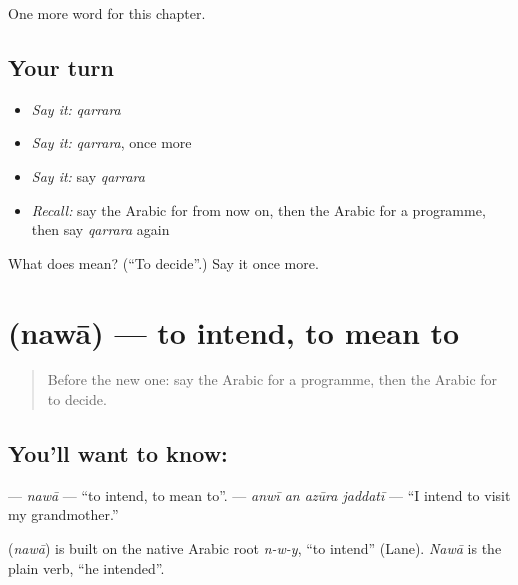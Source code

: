 \begin{grammarlens}[title={What you've built}]
One more word for this chapter.
\end{grammarlens}

\subsection*{Your turn}
\begin{itemize}
\raggedright
  \item \emph{Say it:} \emph{qarrara}
  \item \emph{Say it:} \emph{qarrara}, once more
  \item \emph{Say it:} say \emph{qarrara}
  \item \emph{Recall:} say the Arabic for from now on, then the Arabic for a programme, then say \emph{qarrara} again
\end{itemize}

\begin{tcolorbox}[breakable,colback=teal!4,colframe=teal!35!black,title={Before you move on}]
What does  mean? (\textquotedblleft{}To decide\textquotedblright{}.) Say it once more.
\end{tcolorbox}
\section[\texorpdfstring{\ar{نوى} (nawā)}{نوى (nawā)}]{ (nawā) — to intend, to mean to}

\label{lesson:AR-C157-nawa}



\begin{quote}
Before the new one: say the Arabic for a programme, then the Arabic for to decide.
\end{quote}

\subsection*{You'll want to know: }
\textbf{} — \emph{nawā} — \textquotedblleft{}to intend, to mean to\textquotedblright{}. \textbf{   } — \emph{anwī an azūra jaddatī} — \textquotedblleft{}I intend to visit my grandmother.\textquotedblright{}

\begin{cousinweb}
\textbf{} (\emph{nawā}) is built on the native Arabic root \emph{n-w-y}, \textquotedblleft{}to intend\textquotedblright{} (Lane). \emph{Nawā} is the plain verb, \textquotedblleft{}he intended\textquotedblright{}.
\end{cousinweb}

